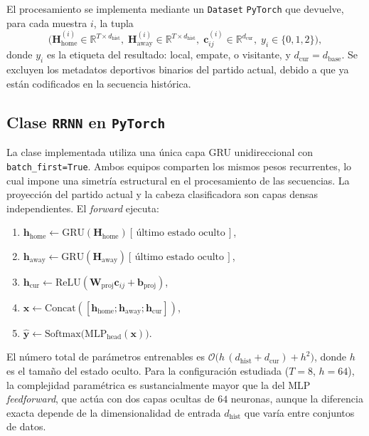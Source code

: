 El procesamiento se implementa mediante un \texttt{Dataset} \texttt{PyTorch} que devuelve, para cada muestra $i$, la tupla
\[
\bigl(\mathbf{H}_{\mathrm{home}}^{(i)}\in\mathbb{R}^{T\times d_{\mathrm{hist}}},\;
\mathbf{H}_{\mathrm{away}}^{(i)}\in\mathbb{R}^{T\times d_{\mathrm{hist}}},\;
\mathbf{c}_{ij}^{(i)}\in\mathbb{R}^{d_{\mathrm{cur}}},\;
y_i\in\{0,1,2\}\bigr),
\]
donde $y_i$ es la etiqueta del resultado: local, empate, o visitante, y $d_{\mathrm{cur}}=d_{\mathrm{base}}$. Se excluyen los metadatos deportivos binarios del partido actual, debido a que ya est\'an codificados en la secuencia hist\'orica.

\subsection{Clase \texttt{RRNN} en \texttt{PyTorch}}
\label{subsec:app_gru_clase}

La clase implementada utiliza una \'unica capa GRU unidireccional con \texttt{batch\_first=True}. Ambos equipos comparten los mismos pesos recurrentes, lo cual impone una simetr\'ia estructural en el procesamiento de las secuencias. La proyecci\'on del partido actual y la cabeza clasificadora son capas densas independientes. El \textit{forward} ejecuta:
\begin{enumerate}
	\item $\mathbf{h}_{\mathrm{home}} \leftarrow \mathrm{GRU}(\mathbf{H}_{\mathrm{home}})[\,\text{\'ultimo estado oculto}\,]$,
	\item $\mathbf{h}_{\mathrm{away}} \leftarrow \mathrm{GRU}(\mathbf{H}_{\mathrm{away}})[\,\text{\'ultimo estado oculto}\,]$,
	\item $\mathbf{h}_{\mathrm{cur}} \leftarrow \mathrm{ReLU}(\boldsymbol{W}_{\mathrm{proj}}\mathbf{c}_{ij} + \mathbf{b}_{\mathrm{proj}})$,
	\item $\mathbf{x} \leftarrow \mathrm{Concat}([\mathbf{h}_{\mathrm{home}};\mathbf{h}_{\mathrm{away}};\mathbf{h}_{\mathrm{cur}}])$,
	\item $\hat{\mathbf{y}} \leftarrow \mathrm{Softmax}\bigl(\mathrm{MLP}_{\mathrm{head}}(\mathbf{x})\bigr)$.
\end{enumerate}

El n\'umero total de par\'ametros entrenables es $\mathcal{O}\bigl(h\,(d_{\mathrm{hist}}+d_{\mathrm{cur}})+h^{2}\bigr)$, donde $h$ es el tama\~no del estado oculto. Para la configuraci\'on estudiada ($T=8$, $h=64$), la complejidad param\'etrica es sustancialmente mayor que la del MLP \textit{feedforward}, que act\'ua con dos capas ocultas de $64$ neuronas, aunque la diferencia exacta depende de la dimensionalidad de entrada $d_{\mathrm{hist}}$ que var\'ia entre conjuntos de datos.

